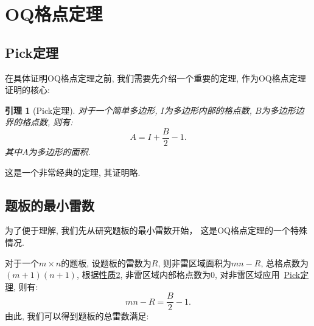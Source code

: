 \documentclass{ctexart}
\newcommand{\varible}[1]{{\Noto[#1]}}
\newtheorem{lemma}{引理}
\begin{document}
\section{OQ格点定理}
\subsection{Pick定理}
在具体证明OQ格点定理之前, 我们需要先介绍一个重要的定理, 作为OQ格点定理证明的核心:
\begin{lemma}[Pick定理]
    \label{pick}
    对于一个简单多边形, $I$为多边形内部的格点数, $B$为多边形边界的格点数, 则有:
    \begin{equation}
        A = I + \frac{B}{2} - 1.
    \end{equation}
    其中$A$为多边形的面积.
\end{lemma}
这是一个非常经典的定理, 其证明略.

\subsection{\varible{O}\varible{Q}题板的最小雷数}
为了便于理解, 我们先从研究\varible{O}\varible{Q}题板的最小雷数开始， 这是OQ格点定理的一个特殊情况.

对于一个$m\times n$的题板, 设题板的雷数为$R$, 则非雷区域面积为$mn-R$, 总格点数为$(m+1)(n+1)$, 根据\hyperref[p2]{性质2}, 非雷区域内部格点数为0, 对非雷区域应用\ \hyperref[pick]{Pick定理}, 则有:
\begin{equation}
    \label{basic equation}
    mn - R = \frac{B}{2} - 1.
\end{equation}
由此, 我们可以得到\varible{O}\varible{Q}题板的总雷数满足:
\end{document}
